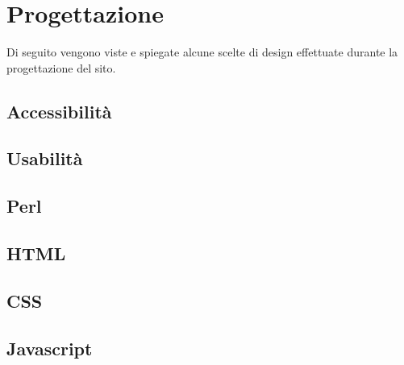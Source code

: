 \section{Progettazione}

Di seguito vengono viste e spiegate alcune scelte di design effettuate durante la progettazione del sito.

\subsection{Accessibilit\`a}

\subsection{Usabilit\`a}

\subsection{Perl}

\subsection{HTML}

\subsection{CSS}

\subsection{Javascript}
